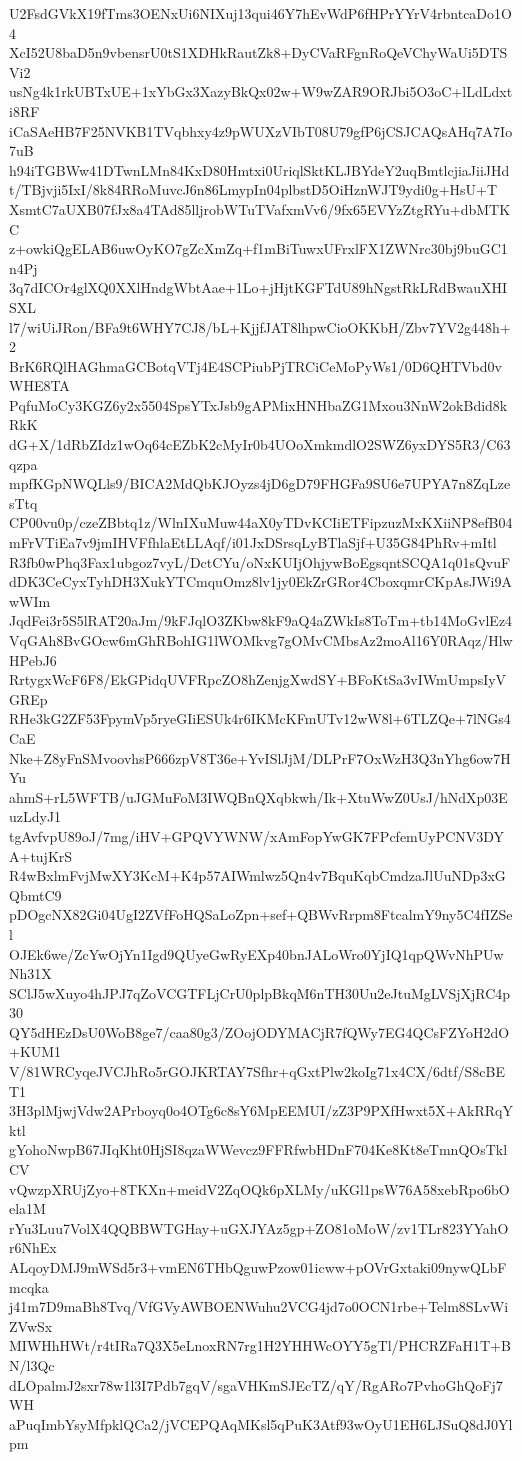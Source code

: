 U2FsdGVkX19fTms3OENxUi6NIXuj13qui46Y7hEvWdP6fHPrYYrV4rbntcaDo1O4
XcI52U8baD5n9vbensrU0tS1XDHkRautZk8+DyCVaRFgnRoQeVChyWaUi5DTSVi2
usNg4k1rkUBTxUE+1xYbGx3XazyBkQx02w+W9wZAR9ORJbi5O3oC+lLdLdxti8RF
iCaSAeHB7F25NVKB1TVqbhxy4z9pWUXzVIbT08U79gfP6jCSJCAQsAHq7A7Io7uB
h94iTGBWw41DTwnLMn84KxD80Hmtxi0UriqlSktKLJBYdeY2uqBmtlcjiaJiiJHd
t/TBjvji5IxI/8k84RRoMuvcJ6n86LmypIn04plbstD5OiHznWJT9ydi0g+HsU+T
XsmtC7aUXB07fJx8a4TAd85lljrobWTuTVafxmVv6/9fx65EVYzZtgRYu+dbMTKC
z+owkiQgELAB6uwOyKO7gZcXmZq+f1mBiTuwxUFrxlFX1ZWNrc30bj9buGC1n4Pj
3q7dICOr4glXQ0XXlHndgWbtAae+1Lo+jHjtKGFTdU89hNgstRkLRdBwauXHISXL
l7/wiUiJRon/BFa9t6WHY7CJ8/bL+KjjfJAT8lhpwCioOKKbH/Zbv7YV2g448h+2
BrK6RQlHAGhmaGCBotqVTj4E4SCPiubPjTRCiCeMoPyWs1/0D6QHTVbd0vWHE8TA
PqfuMoCy3KGZ6y2x5504SpsYTxJsb9gAPMixHNHbaZG1Mxou3NnW2okBdid8kRkK
dG+X/1dRbZIdz1wOq64cEZbK2cMyIr0b4UOoXmkmdlO2SWZ6yxDYS5R3/C63qzpa
mpfKGpNWQLls9/BICA2MdQbKJOyzs4jD6gD79FHGFa9SU6e7UPYA7n8ZqLzesTtq
CP00vu0p/czeZBbtq1z/WlnIXuMuw44aX0yTDvKCIiETFipzuzMxKXiiNP8efB04
mFrVTiEa7v9jmIHVFfhlaEtLLAqf/i01JxDSrsqLyBTlaSjf+U35G84PhRv+mItl
R3fb0wPhq3Fax1ubgoz7vyL/DctCYu/oNxKUIjOhjywBoEgsqntSCQA1q01sQvuF
dDK3CeCyxTyhDH3XukYTCmquOmz8lv1jy0EkZrGRor4CboxqmrCKpAsJWi9AwWIm
JqdFei3r5S5lRAT20aJm/9kFJqlO3ZKbw8kF9aQ4aZWkIs8ToTm+tb14MoGvlEz4
VqGAh8BvGOcw6mGhRBohIG1lWOMkvg7gOMvCMbsAz2moAl16Y0RAqz/HlwHPebJ6
RrtygxWcF6F8/EkGPidqUVFRpcZO8hZenjgXwdSY+BFoKtSa3vIWmUmpsIyVGREp
RHe3kG2ZF53FpymVp5ryeGIiESUk4r6IKMcKFmUTv12wW8l+6TLZQe+7lNGs4CaE
Nke+Z8yFnSMvoovhsP666zpV8T36e+YvISlJjM/DLPrF7OxWzH3Q3nYhg6ow7HYu
ahmS+rL5WFTB/uJGMuFoM3IWQBnQXqbkwh/Ik+XtuWwZ0UsJ/hNdXp03EuzLdyJ1
tgAvfvpU89oJ/7mg/iHV+GPQVYWNW/xAmFopYwGK7FPcfemUyPCNV3DYA+tujKrS
R4wBxlmFvjMwXY3KcM+K4p57AIWmlwz5Qn4v7BquKqbCmdzaJlUuNDp3xGQbmtC9
pDOgcNX82Gi04UgI2ZVfFoHQSaLoZpn+sef+QBWvRrpm8FtcalmY9ny5C4fIZSel
OJEk6we/ZcYwOjYn1Igd9QUyeGwRyEXp40bnJALoWro0YjIQ1qpQWvNhPUwNh31X
SClJ5wXuyo4hJPJ7qZoVCGTFLjCrU0plpBkqM6nTH30Uu2eJtuMgLVSjXjRC4p30
QY5dHEzDsU0WoB8ge7/caa80g3/ZOojODYMACjR7fQWy7EG4QCsFZYoH2dO+KUM1
V/81WRCyqeJVCJhRo5rGOJKRTAY7Sfhr+qGxtPlw2koIg71x4CX/6dtf/S8cBET1
3H3plMjwjVdw2APrboyq0o4OTg6c8sY6MpEEMUI/zZ3P9PXfHwxt5X+AkRRqYktl
gYohoNwpB67JIqKht0HjSI8qzaWWevcz9FFRfwbHDnF704Ke8Kt8eTmnQOsTklCV
vQwzpXRUjZyo+8TKXn+meidV2ZqOQk6pXLMy/uKGl1psW76A58xebRpo6bOela1M
rYu3Luu7VolX4QQBBWTGHay+uGXJYAz5gp+ZO81oMoW/zv1TLr823YYahOr6NhEx
ALqoyDMJ9mWSd5r3+vmEN6THbQguwPzow01icww+pOVrGxtaki09nywQLbFmcqka
j41m7D9maBh8Tvq/VfGVyAWBOENWuhu2VCG4jd7o0OCN1rbe+Telm8SLvWiZVwSx
MIWHhHWt/r4tIRa7Q3X5eLnoxRN7rg1H2YHHWcOYY5gTl/PHCRZFaH1T+BN/l3Qc
dLOpalmJ2sxr78w1l3I7Pdb7gqV/sgaVHKmSJEcTZ/qY/RgARo7PvhoGhQoFj7WH
aPuqImbYsyMfpklQCa2/jVCEPQAqMKsl5qPuK3Atf93wOyU1EH6LJSuQ8dJ0Ylpm
